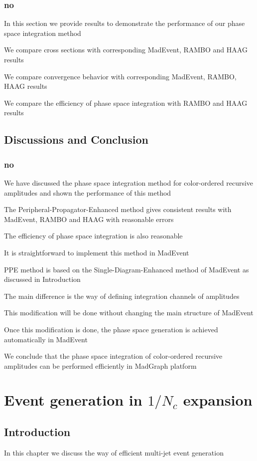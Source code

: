 \documentclass{book}
\begin{document}
\subsection{no}
In this section we provide results to demonstrate the performance of our phase space integration method

We compare cross sections with corresponding MadEvent, RAMBO and HAAG results

We compare convergence behavior with corresponding MadEvent, RAMBO, HAAG results

We compare the efficiency of phase space integration with RAMBO and HAAG results

\section{Discussions and Conclusion}
\subsection{no}
We have discussed the phase space integration method for color-ordered recursive amplitudes and shown the performance of this method

The Peripheral-Propagator-Enhanced method gives consistent results with MadEvent, RAMBO and HAAG with reasonable errors

The efficiency of phase space integration is also reasonable

It is straightforward to implement this method in MadEvent

PPE method is based on the Single-Diagram-Enhanced method of MadEvent as discussed in Introduction

The main difference is the way of defining integration channels of amplitudes

This modification will be done without changing the main structure of MadEvent

Once this modification is done, the phase space generation is achieved automatically in MadEvent

We conclude that the phase space integration of color-ordered recursive amplitudes can be performed efficiently in MadGraph platform

\chapter{Event generation in $1/N_c$ expansion}
\section{Introduction }
In this chapter we discuss the way of efficient multi-jet event generation
\end{document}
